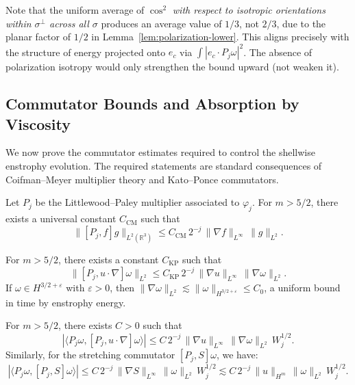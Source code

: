 \documentclass[11pt]{article}
\begin{document}
\begin{remark}
Note that the uniform average of $\cos^2$ \emph{with respect to isotropic orientations within $\sigma^\perp$ across all $\sigma$} produces an average value of $1/3$, not $2/3$, due to the planar factor of $1/2$ in Lemma~\ref{lem:polarization-lower}. This aligns precisely with the structure of energy projected onto $e_c$ via $\int |e_c \cdot P_j\omega|^2$. The absence of polarization isotropy would only strengthen the bound upward (not weaken it).
\end{remark}

\subsection{Commutator Bounds and Absorption by Viscosity}

We now prove the commutator estimates required to control the shellwise enstrophy evolution. The required statements are standard consequences of Coifman--Meyer multiplier theory and Kato--Ponce commutators.

\begin{lemma} \label{lem:CM}
Let $P_j$ be the Littlewood--Paley multiplier associated to $\varphi_j$. For $m > 5/2$, there exists a universal constant $C_{\mathrm{CM}}$ such that
\begin{equation}
\| [P_j, f] g \|_{L^2(\mathbb{R}^3)} \leq C_{\mathrm{CM}} \, 2^{-j} \, \|\nabla f\|_{L^\infty} \, \|g\|_{L^2}. \tag{4.6}
\end{equation}
\end{lemma}

\begin{lemma} \label{lem:KP}
For $m > 5/2$, there exists a constant $C_{\mathrm{KP}}$ such that
\begin{equation}
\| [P_j, u \cdot \nabla] \omega \|_{L^2} \leq C_{\mathrm{KP}} \, 2^{-j} \, \| \nabla u \|_{L^\infty} \, \| \nabla \omega \|_{L^2}. \tag{4.7}
\end{equation}
If $\omega \in H^{3/2 + \varepsilon}$ with $\varepsilon > 0$, then $\| \nabla \omega\|_{L^2} \lesssim \|\omega\|_{H^{3/2+\varepsilon}} \leq C_0$, a uniform bound in time by enstrophy energy.
\end{lemma}

\begin{lemma} \label{lem:comm-energy}
For $m > 5/2$, there exists $C > 0$ such that
\begin{equation}
|\langle P_j \omega, [P_j, u \cdot \nabla] \omega \rangle| \leq C \, 2^{-j} \, \|\nabla u\|_{L^\infty} \, \|\nabla \omega\|_{L^2} \, W_j^{1/2}. \tag{4.8}
\end{equation}
Similarly, for the stretching commutator $[P_j, S]\omega$, we have:
\begin{equation}
|\langle P_j \omega, [P_j, S] \omega \rangle| \leq C \, 2^{-j} \, \|\nabla S\|_{L^\infty} \, \|\omega\|_{L^2} \, W_j^{1/2} \lesssim C \, 2^{-j} \, \|u\|_{H^m} \, \|\omega\|_{L^2} \, W_j^{1/2}. \tag{4.9}
\end{equation}
\end{lemma}
\end{document}
